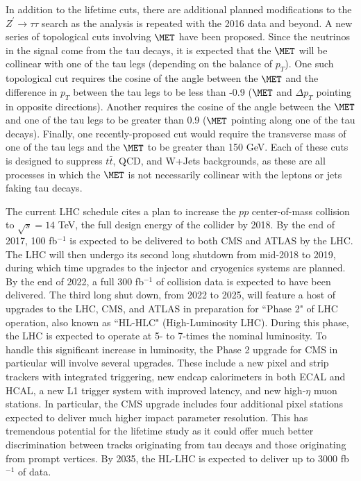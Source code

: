 In addition to the lifetime cuts, there are additional planned modifications to the $Z^\prime\to\tau\tau$ search as the analysis is repeated with the 2016 data and beyond. A new series of topological cuts involving $\MET$ have been proposed. Since the neutrinos in the signal come from the tau decays, it is expected that the $\MET$ will be collinear with one of the tau legs (depending on the balance of $p_T$). One such topological cut requires the cosine of the angle between the $\MET$ and the difference in $p_T$ between the tau legs to be less than -0.9 ($\MET$ and $\Delta p_T$ pointing in opposite directions). Another requires the cosine of the angle between the $\MET$ and one of the tau legs to be greater than 0.9 ($\MET$ pointing along one of the tau decays). Finally, one recently-proposed cut would require the transverse mass of one of the tau legs and the $\MET$ to be greater than 150 GeV. Each of these cuts is designed to suppress $t\bar{t}$, QCD, and W+Jets backgrounds, as these are all processes in which the $\MET$ is not necessarily collinear with the leptons or jets faking tau decays.

The current LHC schedule cites a plan to increase the $pp$ center-of-mass collision to $\sqrt{s} = 14$ TeV, the full design energy of the collider by 2018. By the end of 2017, 100 fb$^{-1}$ is expected to be delivered to both CMS and ATLAS by the LHC. The LHC will then undergo its second long shutdown from mid-2018 to 2019, during which time upgrades to the injector and cryogenics systems are planned. By the end of 2022, a full 300 fb$^{-1}$ of collision data is expected to have been delivered. The third long shut down, from 2022 to 2025, will feature a host of upgrades to the LHC, CMS, and ATLAS in preparation for ``Phase 2" of LHC operation, also known as ``HL-HLC" (High-Luminosity LHC)\cite{LHCSchedule}. During this phase, the LHC is expected to operate at 5- to 7-times the nominal luminosity. To handle this significant increase in luminosity, the Phase 2 upgrade for CMS in particular will involve several upgrades. These include a new pixel and strip trackers with integrated triggering, new endcap calorimeters in both ECAL and HCAL, a new L1 trigger system with improved latency, and new high-$\eta$ muon stations\cite{CMSUpgrade}. In particular, the CMS upgrade includes four additional pixel stations expected to deliver much higher impact parameter resolution. This has tremendous potential for the lifetime study as it could offer much better discrimination between tracks originating from tau decays and those originating from prompt vertices. By 2035, the HL-LHC is expected to deliver up to 3000 fb$^{-1}$ of data\cite{LHCSchedule}.

